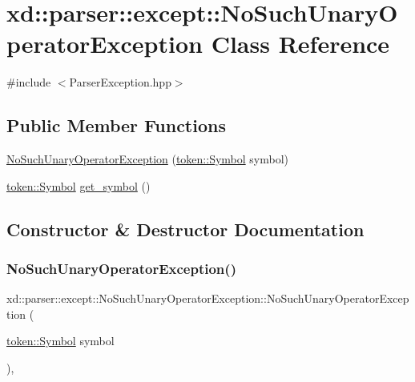 \hypertarget{classxd_1_1parser_1_1except_1_1_no_such_unary_operator_exception}{}\section{xd\+:\+:parser\+:\+:except\+:\+:No\+Such\+Unary\+Operator\+Exception Class Reference}
\label{classxd_1_1parser_1_1except_1_1_no_such_unary_operator_exception}


{\ttfamily \#include $<$Parser\+Exception.\+hpp$>$}

\subsection*{Public Member Functions}
\begin{DoxyCompactItemize}
\item 
\mbox{\hyperlink{classxd_1_1parser_1_1except_1_1_no_such_unary_operator_exception_a63a89a25a385df18956e31827a3d0c00}{No\+Such\+Unary\+Operator\+Exception}} (\mbox{\hyperlink{classxd_1_1parser_1_1token_1_1_symbol}{token\+::\+Symbol}} symbol)
\item 
\mbox{\hyperlink{classxd_1_1parser_1_1token_1_1_symbol}{token\+::\+Symbol}} \mbox{\hyperlink{classxd_1_1parser_1_1except_1_1_no_such_unary_operator_exception_a861aec9b0e58694129a4d2e257392777}{get\+\_\+symbol}} ()
\end{DoxyCompactItemize}


\subsection{Constructor \& Destructor Documentation}
\mbox{\label{classxd_1_1parser_1_1except_1_1_no_such_unary_operator_exception_a63a89a25a385df18956e31827a3d0c00}} 
\subsubsection{\texorpdfstring{No\+Such\+Unary\+Operator\+Exception()}{NoSuchUnaryOperatorException()}}
{\footnotesize\ttfamily xd\+::parser\+::except\+::\+No\+Such\+Unary\+Operator\+Exception\+::\+No\+Such\+Unary\+Operator\+Exception (\begin{DoxyParamCaption}\item[{\mbox{\hyperlink{classxd_1_1parser_1_1token_1_1_symbol}{token\+::\+Symbol}}}]{symbol }\end{DoxyParamCaption})\hspace{0.3cm}{\ttfamily [inline]}, {\ttfamily [explicit]}}



